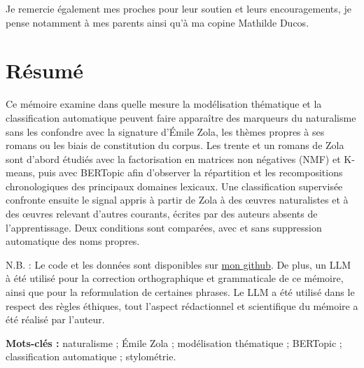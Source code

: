 \documentclass[12pt,a4paper,oneside]{report}
\begin{document}
Je remercie également mes proches pour leur soutien et leurs encouragements, je pense notamment à mes parents ainsi qu'à ma copine Mathilde Ducos. 

\chapter*{Résumé}

Ce mémoire examine dans quelle mesure la modélisation thématique et la classification automatique peuvent faire apparaître des marqueurs du naturalisme sans les confondre avec la signature d'Émile Zola, les thèmes propres à ses romans ou les biais de constitution du corpus. Les trente et un romans de Zola sont d'abord étudiés avec la factorisation en matrices non négatives (NMF) et K-means, puis avec BERTopic afin d'observer la répartition et les recompositions chronologiques des principaux domaines lexicaux. Une classification supervisée confronte ensuite le signal appris à partir de Zola à des œuvres naturalistes et à des œuvres relevant d'autres courants, écrites par des auteurs absents de l'apprentissage. Deux conditions sont comparées, avec et sans suppression automatique des noms propres.

N.B. : Le code et les données sont disponibles sur \href{https://github.com/MorganRichard25}{mon github}. De plus, un LLM à été utilisé pour la correction orthographique et grammaticale de ce mémoire, ainsi que pour la reformulation de certaines phrases. Le LLM a été utilisé dans le respect des règles éthiques, tout l'aspect rédactionnel et scientifique du mémoire a été réalisé par l'auteur. 

\noindent\textbf{Mots-clés :} naturalisme ; Émile Zola ; modélisation thématique ; BERTopic ; classification automatique ; stylométrie.

\tableofcontents
\listoffigures
\listoftables

\clearpage
{}







\nocite{*}
\printbibliography[nottype=online, heading=bibintoc, title={Bibliographie}]
\printbibliography[type=online, heading=bibintoc, title={Sitographie}]


\appendix

\end{document}
